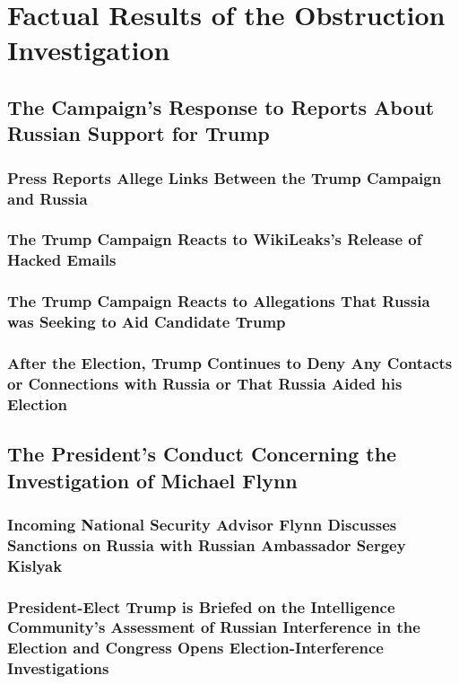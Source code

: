 \section{Factual Results of the Obstruction Investigation}

\subsection{The Campaign's Response to Reports About Russian Support for Trump}

\subsubsection{Press Reports Allege Links Between the Trump Campaign and Russia}

\subsubsection{The Trump Campaign Reacts to WikiLeaks's Release of Hacked Emails}

\subsubsection{The Trump Campaign Reacts to Allegations That Russia was Seeking to Aid Candidate Trump}

\subsubsection{After the Election, Trump Continues to Deny Any Contacts or Connections with Russia or That Russia Aided his Election}

\subsection{The President's Conduct Concerning the Investigation of Michael Flynn}

\subsubsection{Incoming National Security Advisor Flynn Discusses Sanctions on Russia with Russian Ambassador Sergey Kislyak}

\subsubsection{President-Elect Trump is Briefed on the Intelligence Community's Assessment of Russian Interference in the Election and Congress Opens Election-Interference Investigations}

